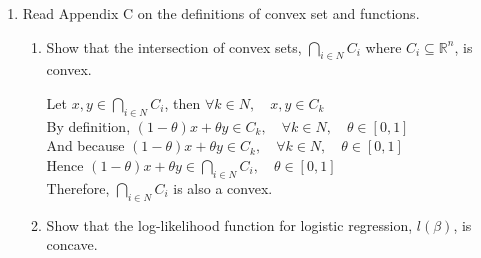 \documentclass[12pt]{article}
\begin{document}
\begin {enumerate}
\begin {flushleft}
			\end {flushleft}
			\noindent\makebox[\linewidth]{\rule{\textwidth}{0.4pt}}
			
		\item Read Appendix C on the definitions of convex set and functions.
			\begin {enumerate}
				\item Show that the intersection of convex sets, 
					$\displaystyle\bigcap_{i \in N}C_i$ where $C_i \subseteq \mathbb{R}^n$, is convex.
				
					\noindent\makebox[\linewidth]{\rule{\textwidth}{0.4pt}}
					\begin {flushleft} %
					
						Let $x, y \in \displaystyle\bigcap_{i \in N}C_i$, then $\forall k \in N, \quad x, y \in C_k$ \\
						By definition, $(1 - \theta)x + \theta y \in C_k, \quad \forall k \in N, \quad \theta \in [0, 1]$ \\
						And because $(1 - \theta)x + \theta y \in C_k, \quad \forall k \in N, \quad \theta \in [0, 1]$ \\
						Hence $(1 - \theta)x + \theta y \in \displaystyle\bigcap_{i \in N}C_i, \quad \theta \in [0, 1]$ \\
						Therefore, $ \displaystyle\bigcap_{i \in N}C_i $ is also a convex.
					
					\end {flushleft}
					\noindent\makebox[\linewidth]{\rule{\textwidth}{0.4pt}}
					
				\item Show that the log-likelihood function for logistic regression, $l(\beta)$, is concave.
				
					\noindent\makebox[\linewidth]{\rule{\textwidth}{0.4pt}}
					\begin {flushleft} %
					

\end{flushleft}
\end{enumerate}
\end{enumerate}
\end{document}
